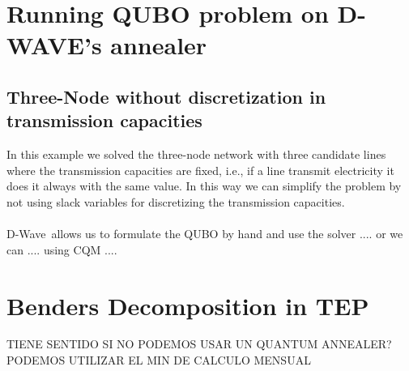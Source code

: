 \section{Running QUBO problem on D-WAVE's annealer}

\subsection{Three-Node without discretization in transmission capacities}
In this example we solved the three-node network with three candidate lines where the transmission capacities are fixed, i.e., if a line transmit electricity it does it always with the same value. In this way we can simplify the problem by not using slack variables for discretizing the transmission capacities.\\\\
D-Wave\,\cite{D-WaveDocumentation} allows us to formulate the QUBO by hand and use the  solver .... or we can .... using CQM ....
\section{Benders Decomposition in TEP}
TIENE SENTIDO SI NO PODEMOS USAR UN QUANTUM ANNEALER? PODEMOS UTILIZAR EL MIN DE CALCULO MENSUAL

